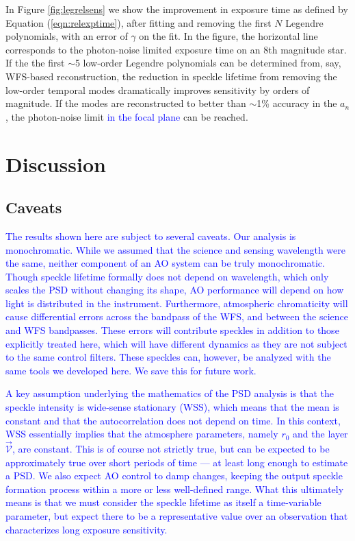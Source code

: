 \documentclass[10pt,preprint]{aastex631}
\newcommand{\jrmadd}[1]{\textcolor{blue}{#1}}
\begin{document}
In Figure \ref{fig:legrelsens} we show the improvement in exposure time as defined by Equation (\ref{eqn:relexptime}), after fitting and removing the first $N$ Legendre polynomials, with an error of $\gamma$ on the fit.  In the figure, the horizontal line corresponds to the photon-noise limited exposure time on an 8th magnitude star.  If the the first $\sim$5 low-order Legendre polynomials can be determined from, say, WFS-based reconstruction, the reduction in speckle lifetime from removing the low-order temporal modes dramatically improves sensitivity by orders of magnitude.  If the modes are reconstructed to better than $\sim$1\% accuracy in the $a_n$, the photon-noise limit \jrmadd{in the focal plane} can be reached.

\section{Discussion}
\label{sec:discussion}

\subsection{Caveats}
\jrmadd{The results shown here are subject to several caveats.  Our analysis is monochromatic. While we assumed that the science and sensing wavelength were the same, neither component of an AO system can be truly monochromatic.  Though speckle lifetime formally does not depend on wavelength, which only scales the PSD without changing its shape, AO performance will depend on how light is distributed in the instrument.  Furthermore, atmospheric chromaticity will cause differential errors across the bandpass of the WFS, and between the science and WFS bandpasses.  These errors will contribute speckles in addition to those explicitly treated here, which will have different dynamics as they are not subject to the same control filters.  These speckles can, however, be analyzed with the same tools we developed here.  We save this for future work.}

\jrmadd{A key assumption underlying the mathematics of the PSD analysis is that the speckle intensity is wide-sense stationary (WSS), which means that the mean is constant and that the autocorrelation does not depend on time.  In this context, WSS essentially implies that the atmosphere parameters, namely $r_0$ and the layer $\vec{\mathcal{V}}$, are constant.  This is of course not strictly true, but can be expected to be approximately true over short periods of time --- at least long enough to estimate a PSD.  We also expect AO control to damp changes, keeping the output speckle formation process within a more or less well-defined range.  What this ultimately means is that we must consider the speckle lifetime as itself a time-variable parameter, but expect there to be a representative value over an observation that characterizes long exposure sensitivity.}
\end{document}
